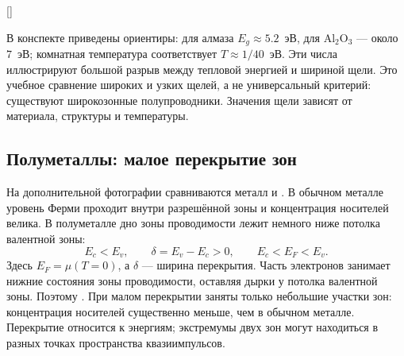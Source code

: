 \documentclass[../final.tex]{subfiles}
\begin{document}
\begin{rbox}[unbreakable,left=18pt,right=18pt,top=14pt,bottom=10pt]{[]}
\end{rbox}

В конспекте приведены ориентиры: для алмаза $E_g\approx5.2$~эВ,
для $\mathrm{Al_2O_3}$ --- около $7$~эВ; комнатная температура соответствует
$T\approx1/40$~эВ. Эти числа иллюстрируют большой разрыв между тепловой
энергией и шириной щели.
 Это учебное сравнение широких
и узких щелей, а не универсальный критерий: существуют широкозонные
полупроводники. Значения щели зависят от материала, структуры и температуры.

\subsection{Полуметаллы: малое перекрытие зон}
На дополнительной фотографии сравниваются металл и
. В обычном металле уровень Ферми проходит внутри
разрешённой зоны и концентрация носителей велика. В полуметалле дно
зоны проводимости лежит немного ниже потолка валентной зоны:
\begin{equation*}
 E_c<E_v,\qquad \delta=E_v-E_c>0,\qquad E_c<E_F<E_v.
\end{equation*}
Здесь $E_F=\mu(T=0)$, а $\delta$ --- ширина перекрытия.
Часть электронов занимает нижние состояния зоны проводимости,
оставляя дырки у потолка валентной зоны. Поэтому
.
При малом перекрытии заняты только небольшие участки зон:
концентрация носителей существенно меньше, чем в обычном металле.
Перекрытие относится к энергиям; экстремумы двух зон могут находиться
в разных точках пространства квазиимпульсов.
\end{document}
